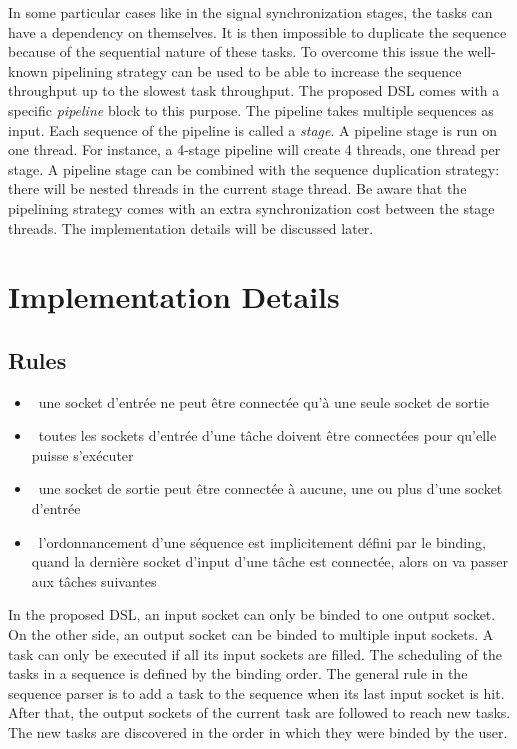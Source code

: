 In some particular cases like in the signal synchronization stages, the tasks
can have a dependency on themselves. It is then impossible to duplicate the
sequence because of the sequential nature of these tasks. To overcome this issue
the well-known pipelining strategy can be used to be able to increase the
sequence throughput up to the slowest task throughput. The proposed DSL comes
with a specific \emph{pipeline} block to this purpose. The pipeline takes
multiple sequences as input. Each sequence of the pipeline is called a
\emph{stage}. A pipeline stage is run on one thread. For instance, a 4-stage
pipeline will create 4 threads, one thread per stage. A pipeline stage can be
combined with the sequence duplication strategy: there will be nested threads in
the current stage thread. Be aware that the pipelining strategy comes with an
extra synchronization cost between the stage threads. The implementation details
will be discussed later.

\section{Implementation Details}

\subsection{Rules}

\begin{itemize}
  \item \cmark~une socket d'entrée ne peut être connectée qu'à une seule socket de
    sortie
  \item \cmark~toutes les sockets d'entrée d'une tâche doivent être connectées pour
    qu'elle puisse s'exécuter
  \item \cmark~une socket de sortie peut être connectée à aucune, une ou plus d'une
    socket d'entrée
  \item \cmark~l'ordonnancement d'une séquence est implicitement défini par le binding,
    quand la dernière socket d'input d'une tâche est connectée, alors on va
    passer aux tâches suivantes
\end{itemize}

In the proposed DSL, an input socket can only be binded to one output socket.
On the other side, an output socket can be binded to multiple input sockets.
A task can only be executed if all its input sockets are filled. The scheduling
of the tasks in a sequence is defined by the binding order. The general rule
in the sequence parser is to add a task to the sequence when its last input
socket is hit. After that, the output sockets of the current task are followed
to reach new tasks. The new tasks are discovered in the order in which they were
binded by the user.

